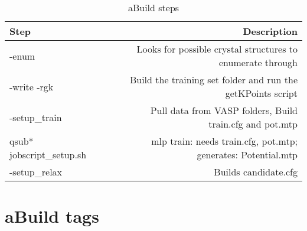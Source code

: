 \documentclass{article}
\begin{document}
\begin{table}
        \begin{center}
                \caption{aBuild steps}
                \label{bashcommands}
                \begin{tabular}{l|r}
                  \textbf{Step} & \textbf{Description}\\
                  \hline
                  -enum & Looks for possible crystal structures to
                          enumerate through\\
                  -write -rgk & Build the training set folder and run
                                the getKPoints script\\
                  -setup\_train & Pull data from VASP folders, Build
                                 train.cfg and pot.mtp\\
                  qsub* jobscript\_setup.sh & mlp train: needs
                                             train.cfg, pot.mtp;
                                              generates:
                                              Potential.mtp\\
                  -setup\_relax & Builds candidate.cfg

                                                      
                 \end{tabular}
        \end{center}
\end{table}



\section{aBuild tags} %

\end{document}
